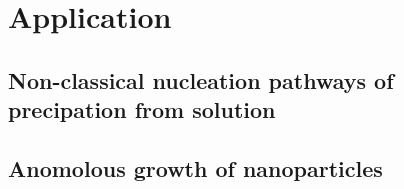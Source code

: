 \documentclass[showkeys, reprint]{revtex4-1}
\begin{document}
\section{Application}

\subsection{Non-classical nucleation pathways of precipation from solution}

\subsection{Anomolous growth of nanoparticles}
\end{document}
